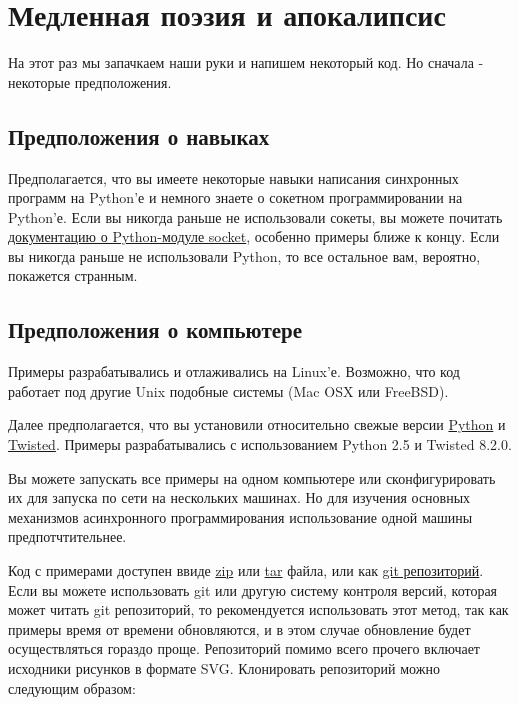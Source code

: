 
\section{Медленная поэзия и апокалипсис\label{sec:part2}}


    На этот раз мы запачкаем наши руки и напишем некоторый код. Но сначала - 
некоторые предположения.


\subsection{Предположения о навыках}


    Предполагается, что вы имеете некоторые навыки написания 
синхронных программ на Python'е и немного знаете о 
сокетном программировании на Python'е. Если вы никогда раньше не 
использовали сокеты, вы можете почитать 
\href{http://docs.python.org/library/socket.html#module-socket}{документацию о Python-модуле socket}, 
особенно примеры ближе к концу. Если вы никогда раньше не 
использовали Python, то все остальное вам, вероятно, покажется странным.  


\subsection{Предположения о компьютере}


    Примеры разрабатывались и отлаживались на Linux'е. 
Возможно, что код работает 
под другие Unix подобные системы (Mac OSX или FreeBSD).


Далее предполагается, что вы установили относительно свежые  
версии 
\href{http://python.org/download}{Python} и 
\href{http://twistedmatrix.com/trac/wiki/Downloads}{Twisted}. 
Примеры разрабатывались с использованием 
Python 2.5 и Twisted 8.2.0.


Вы можете запускать все примеры на одном компьютере или 
сконфигурировать их для запуска по сети на 
нескольких машинах. Но для изучения основных механизмов 
асинхронного программирования использование одной 
машины предпотчтительнее.


Код с примерами доступен ввиде  
\href{http://github.com/jdavisp3/twisted-intro/zipball/master}{zip} или 
\href{http://github.com/jdavisp3/twisted-intro/tarball/master}{tar} файла, или как 
\href{http://github.com/jdavisp3/twisted-intro/tree/master}{git репозиторий}. 
Если вы можете использовать git 
или другую систему контроля версий, которая может читать 
git репозиторий, то рекомендуется использовать этот метод, 
так как примеры время от времени обновляются, и в этом случае 
обновление будет осуществляться гораздо проще. Репозиторий 
помимо всего прочего  
включает исходники рисунков в формате SVG. 
Клонировать репозиторий можно следующим образом: 

